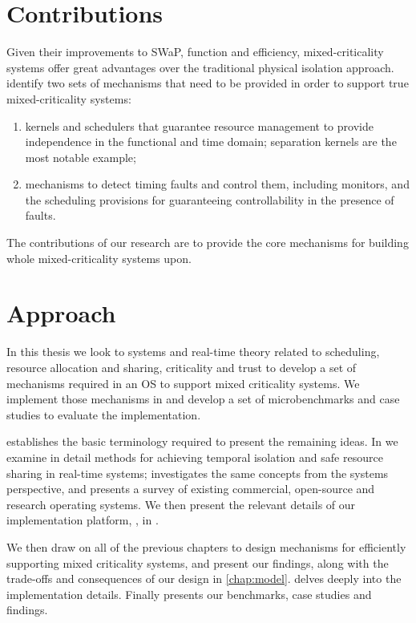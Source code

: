 \section{Contributions}

Given their improvements to \gls{SWaP}, function and efficiency, mixed-criticality systems offer
great advantages over the traditional physical isolation approach. 
\citet{Ernst_DiNatale_16} identify two sets of mechanisms that need to be provided in order to
support true mixed-criticality systems:

\begin{enumerate}
    \item kernels and schedulers that guarantee resource
        management to provide independence in the
        functional and time domain; separation kernels
        are the most notable example;
    \item mechanisms to detect timing faults and control
        them, including monitors, and the scheduling
        provisions for guaranteeing controllability in the
        presence of faults.
\end{enumerate}

The contributions of our research are to provide the core mechanisms for building whole
mixed-criticality systems upon. 

\section{Approach}

In this thesis we look to systems and real-time theory related to scheduling, resource allocation
and sharing, criticality and trust to develop a set of mechanisms required in an \gls{OS} to 
support mixed criticality systems. We implement those mechanisms in \selfour and develop a set of
microbenchmarks and case studies to evaluate the implementation. 

 establishes the basic terminology required to present
the remaining ideas. In  we examine in detail methods for achieving temporal
isolation and safe resource sharing in real-time systems;  investigates
the same concepts from the systems perspective, and presents a survey of existing commercial, open-source
and research operating systems. We then present the relevant details of our implementation platform,
\selfour, in .

We then draw on all of the previous chapters to design mechanisms for efficiently supporting mixed
criticality systems, and present our findings, along with the trade-offs and consequences of our
design in \cref{chap:model}.   delves deeply into the implementation details.
Finally  presents our benchmarks, case studies and findings. 

